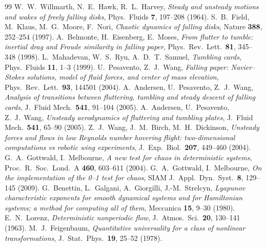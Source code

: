 \documentclass[11pt]{article}
\begin{document}
\begin{thebibliography}{99}
 W.~W.~Willmarth, N.~E.~Hawk, R.~L.~Harvey,
\emph{Steady and unsteady motions and wakes of freely falling disks},
Phys.\ Fluids \textbf{7}, 197--208 (1964).
 S.~B.~Field, M.~Klaus, M.~G.~Moore, F.~Nori,
\emph{Chaotic dynamics of falling disks}, Nature \textbf{388}, 252--254 (1997).
 A.~Belmonte, H.~Eisenberg, E.~Moses,
\emph{From flutter to tumble: inertial drag and Froude similarity in falling paper},
Phys.\ Rev.\ Lett.\ \textbf{81}, 345--348 (1998).
 L.~Mahadevan, W.~S.~Ryu, A.~D.~T.~Samuel,
\emph{Tumbling cards}, Phys.\ Fluids \textbf{11}, 1--3 (1999).
 U.~Pesavento, Z.~J.~Wang,
\emph{Falling paper: Navier--Stokes solutions, model of fluid forces, and center of mass elevation},
Phys.\ Rev.\ Lett.\ \textbf{93}, 144501 (2004).
 A.~Andersen, U.~Pesavento, Z.~J.~Wang,
\emph{Analysis of transitions between fluttering, tumbling and steady descent of falling cards},
J.\ Fluid Mech.\ \textbf{541}, 91--104 (2005).
 A.~Andersen, U.~Pesavento, Z.~J.~Wang,
\emph{Unsteady aerodynamics of fluttering and tumbling plates},
J.\ Fluid Mech.\ \textbf{541}, 65--90 (2005).
 Z.~J.~Wang, J.~M.~Birch, M.~H.~Dickinson,
\emph{Unsteady forces and flows in low Reynolds number hovering flight: two-dimensional
computations vs robotic wing experiments}, J.\ Exp.\ Biol.\ \textbf{207}, 449--460 (2004).
 G.~A.~Gottwald, I.~Melbourne,
\emph{A new test for chaos in deterministic systems},
Proc.\ R.\ Soc.\ Lond.\ A \textbf{460}, 603--611 (2004).
 G.~A.~Gottwald, I.~Melbourne,
\emph{On the implementation of the 0--1 test for chaos},
SIAM J.\ Appl.\ Dyn.\ Syst.\ \textbf{8}, 129--145 (2009).
 G.~Benettin, L.~Galgani, A.~Giorgilli, J.-M.~Strelcyn,
\emph{Lyapunov characteristic exponents for smooth dynamical systems and for Hamiltonian systems; a
method for computing all of them}, Meccanica \textbf{15}, 9--30 (1980).
 E.~N.~Lorenz, \emph{Deterministic nonperiodic flow},
J.\ Atmos.\ Sci.\ \textbf{20}, 130--141 (1963).
 M.~J.~Feigenbaum,
\emph{Quantitative universality for a class of nonlinear transformations},
J.\ Stat.\ Phys.\ \textbf{19}, 25--52 (1978).
\end{thebibliography}
\end{document}
